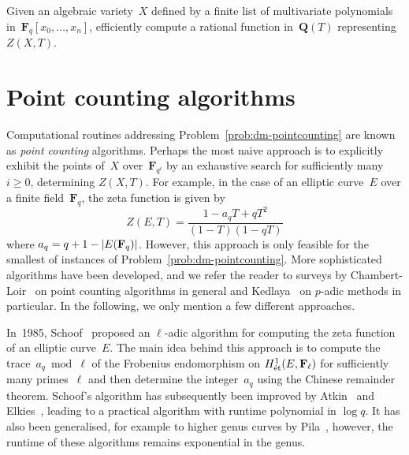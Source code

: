\begin{prob} \label{prob:dm-pointcounting}
Given an algebraic variety~$X$ defined by a finite list of 
multivariate polynomials in~$\mathbf{F}_{q}[x_0, \dotsc, x_n]$, 
efficiently compute a rational function in~$\mathbf{Q}(T)$ 
representing $Z(X, T)$.
\end{prob}


\section{Point counting algorithms}

Computational routines addressing Problem~\ref{prob:dm-pointcounting} are 
known as \emph{point counting} algorithms.  Perhaps the most naive approach 
is to explicitly exhibit the points of~$X$ over~$\mathbf{F}_{q^i}$ by an 
exhaustive search for sufficiently many $i \geq 0$, determining $Z(X, T)$.  
For example, in the case of an elliptic curve~$E$ over a finite 
field~$\mathbf{F}_{q}$, the zeta function is given by 
\begin{equation*}
Z(E, T) = \frac{1 - a_q T + q T^2}{(1 - T)(1 - q T)}
\end{equation*}
where $a_q = q + 1 - \lvert E(\mathbf{F}_{q})\rvert$.  However, this 
approach is only feasible for the smallest of instances of 
Problem~\ref{prob:dm-pointcounting}.  More sophisticated algorithms 
have been developed, and we refer the reader to surveys by 
Chambert-Loir~\citep{ChambertLoir2008} on point counting algorithms 
in general and Kedlaya~\citep{Kedlaya2004} on $p$-adic methods in 
particular.  In the following, we only mention a few different approaches.

In~1985, Schoof~\citep{Schoof1985} proposed an $\ell$-adic algorithm for 
computing the zeta function of an elliptic curve~$E$.  The main idea behind 
this approach is to compute the trace~$a_q \bmod{\ell}$ of the Frobenius 
endomorphism on $H_{\text{\'et}}^{1}(E, \mathbf{F}_{\ell})$ for sufficiently 
many primes~$\ell$ and then determine the integer~$a_q$ using the Chinese 
remainder theorem.  Schoof's algorithm has subsequently been improved by 
Atkin~\citep{Atkin1988,Atkin1992} and Elkies~\citep{Elkies1991,Elkies1998}, 
leading to a practical algorithm with runtime polynomial in $\log q$.  
It has also been generalised, for example to higher genus curves by 
Pila~\citep{Pila1990}, however, the runtime of these algorithms remains 
exponential in the genus.

